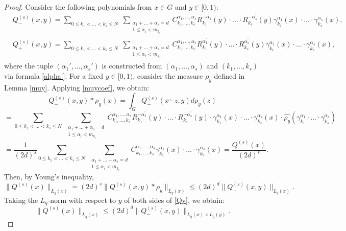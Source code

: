 \documentclass[12pt]{article}
\begin{document}
	\begin{proof}
		Consider the following polynomials from $x\in G$ and $y\in [0,1)$:
		\[
		\begin{split}
			& Q^{(s)}_{-}(x,y) = \sum_{0\le k_1 < \ldots < k_s \le N} \; \sum_{\substack{\alpha_1+\ldots+\alpha_s = d \\ 1 \le \alpha_i < m_{k_i}}} C_{k_1, \ldots, k_s}^{\alpha_1, \ldots, \alpha_s} R_{k_1}^{-\alpha^{\prime}_1}(y) \cdot \ldots \cdot R_{k_s}^{-\alpha^{\prime}_s}(y) \gamma_{k_1}^{\alpha_1}(x) \cdot \ldots \cdot \gamma_{k_s}^{\alpha_s}(x),\\
			& Q^{(s)}_{+}(x,y) = \sum_{0\le k_1 < \ldots < k_s \le N} \; \sum_{\substack{\alpha_1+\ldots+\alpha_s = d \\ 1 \le \alpha_i < m_{k_i}}} C_{k_1, \ldots, k_s}^{\alpha_1, \ldots, \alpha_s} R_{k_1}^{\alpha^{\prime}_1}(y) \cdot \ldots \cdot R_{k_s}^{\alpha^{\prime}_s}(y) \gamma_{k_1}^{\alpha_1}(x) \cdot \ldots \cdot \gamma_{k_s}^{\alpha_s}(x),
		\end{split}
		\]
where the tuple $(\alpha_1', \ldots, \alpha_s')$ is constructed from $(\alpha_1, \ldots, \alpha_s)$ and $(k_1, \ldots, k_s)$ via formula \eqref{alpha'}. For a fixed $y \in [0,1)$, consider the measure $\rho_y$ defined in Lemma \ref{muy}. Applying \eqref{muycoef}, we obtain: 
		\[
		Q^{(s)}_{-}(x,y) * \rho_y(x) = \int_{G} Q^{(s)}_{-} (x\dot-z, y) d \rho_y(z) 
		\]
		\[
		=\sum_{0\le k_1 < \ldots < k_s \le N} \; \sum_{\substack{\alpha_1+\ldots+\alpha_s = d \\ 1 \le \alpha_i < m_{k_i}}} C_{k_1, \ldots, k_s}^{\alpha_1, \ldots, \alpha_s} R_{k_1}^{-\alpha^{\prime}_1}(y) \cdot \ldots \cdot R_{k_s}^{-\alpha^{\prime}_s}(y) \cdot  \gamma_{k_1}^{\alpha_1}(x) \cdot \ldots \cdot \gamma_{k_s}^{\alpha_s}(x) \cdot \widehat{\rho_y}(\gamma_{k_1}^{\alpha_1} \cdot \ldots \cdot \gamma_{k_s}^{\alpha_s})
		\]
		\[
		= \frac{1}{(2d)^s} \sum_{0\le k_1 < \ldots < k_s \le N} \; \sum_{\substack{\alpha_1+\ldots+\alpha_s = d \\ 1 \le \alpha_i < m_{k_i}}} C_{k_1, \ldots, k_s}^{\alpha_1, \ldots, \alpha_s} \gamma_{k_1}^{\alpha_1}(x) \cdot \ldots \cdot \gamma_{k_s}^{\alpha_s}(x) = \frac{Q^{(s)}(x)}{(2d)^s}.
		\]
		Then, by Young's inequality, 
		\begin{equation} \label{Qy}
			\|Q^{(s)}(x)\|_{L_q(x)} = (2d)^{s}\|Q^{(s)}_{-}(x,y)* \rho_y\|_{L_q(x)} \le (2d)^{d}\|Q^{(s)}_{-}(x,y)\|_{L_q(x)}. 
		\end{equation}
		Taking the $L_q$-norm with respect to $y$ of both sides of \eqref{Qy}, we obtain:
		\begin{equation} \label{Qy2}
			\|Q^{(s)} (x)\|_{L_q(x)} \le (2d)^d \|Q^{(s)}_{-}(x,y)\|_{L_q(x)\times L_q(y)}. 
		\end{equation}
		

\end{proof}
\end{document}
